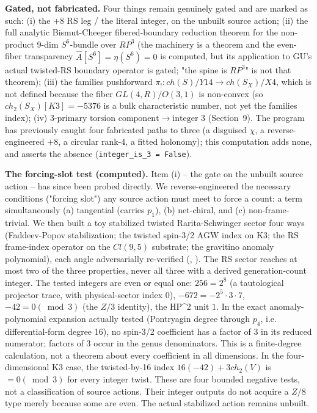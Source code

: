\documentclass[11pt]{article}
\theoremstyle{remark}
\begin{document}
\textbf{Gated, not fabricated.} Four things remain genuinely gated and are marked as such: (i) the $+8$ RS leg / the literal integer, on the unbuilt source action; (ii) the full analytic Bismut-Cheeger fibered-boundary reduction theorem for the non-product 9-dim $S^6$-bundle over $RP^3$ (the machinery is a theorem and the even-fiber transparency $\widehat{A}[S^6] = \eta(S^6) = 0$ is computed, but its application to GU's actual twisted-RS boundary operator is gated; "the spine is $RP^3$" is not that theorem); (iii) the families pushforward $\pi_! : ch(S)/Y14 \to ch(S_X)/X4$, which is not defined because the fiber $GL(4,R)/O(3,1)$ is non-convex (so $ch_2(S_X)[K3] = -5376$ is a bulk characteristic number, not yet the families index); (iv) $3\text{-primary torsion component}\to\text{integer }3$ (Section~9). The program has previously caught four fabricated paths to three (a disguised $\chi$, a reverse-engineered $+8$, a circular rank-4, a fitted holonomy); this computation adds none, and asserts the absence (\texttt{integer\_is\_3 = False}).

\textbf{The forcing-slot test (computed).} Item (i) -- the gate on the unbuilt source action -- has since been probed directly. We reverse-engineered the necessary conditions ("forcing slot") any source action must meet to force a count: a term simultaneously (a) tangential (carries $p_1$), (b) net-chiral, and (c) non-frame-trivial. We then built a toy stabilized twisted Rarita-Schwinger sector four ways (Faddeev-Popov stabilization; the twisted spin-3/2 AGW index on K3; the RS frame-index operator on the $Cl(9,5)$ substrate; the gravitino anomaly polynomial), each angle adversarially re-verified (, ). The RS sector reaches at most two of the three properties, never all three with a derived generation-count integer. The tested integers are even or equal one: $256 = 2^8$ (a tautological projector trace, with physical-sector index 0), $-672 = -2^5 \cdot 3 \cdot 7$, $-42 = 0 (\bmod 3)$ (the $Z/3$ identity), the HP\textasciicircum{}2 unit $1$. In the exact anomaly-polynomial expansion actually tested (Pontryagin degree through $p_4$, i.e. differential-form degree 16), no spin-3/2 coefficient has a factor of 3 in its reduced numerator; factors of 3 occur in the genus denominators. This is a finite-degree calculation, not a theorem about every coefficient in all dimensions. In the four-dimensional K3 case, the twisted-by-16 index $16(-42) + 3 ch_2(V)$ is $= 0 (\bmod 3)$ for every integer twist. These are four bounded negative tests, not a classification of source actions. Their integer outputs do not acquire a $Z/8$ type merely because some are even. The actual stabilized action remains unbuilt.
\end{document}
